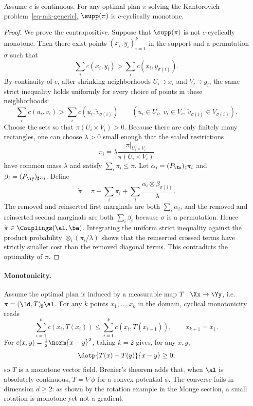 \begin{thm}\label{thm:opt_ccm}
	Assume $c$ is continuous. For any optimal plan $\pi$ solving the Kantorovich problem~\eqref{eq-mk-generic}, $\supp(\pi)$ is $c$-cyclically monotone.
\end{thm}
\begin{proof}
	We prove the contrapositive. Suppose that $\supp(\pi)$ is not $c$-cyclically monotone. Then there exist points $(x_i,y_i)_{i=1}^k$ in the support and a permutation $\sigma$ such that
	\[
		\sum_i c(x_i,y_i)>
		\sum_i c(x_i,y_{\sigma(i)}).
	\]
	By continuity of $c$, after shrinking neighborhoods $U_i\ni x_i$ and $V_i\ni y_i$, the same strict inequality holds uniformly for every choice of points in these neighborhoods:
	\[
		\sum_i c(u_i,v_i)
		>
		\sum_i c(u_i,\tilde v_{\sigma(i)})
		\qquad
		(u_i\in U_i,\ v_i\in V_i,\ \tilde v_{\sigma(i)}\in V_{\sigma(i)}).
	\]
	Choose the sets so that $\pi(U_i\times V_i)>0$. Because there are only finitely many rectangles, one can choose $\lambda>0$ small enough that the scaled restrictions
	\[
		\pi_i=\lambda\frac{\pi|_{U_i\times V_i}}{\pi(U_i\times V_i)}
	\]
	have common mass $\lambda$ and satisfy $\sum_i\pi_i\leq\pi$. Let $\alpha_i=(P_\Xx)_\sharp\pi_i$ and $\beta_i=(P_\Yy)_\sharp\pi_i$. Define
	\[
		\tilde\pi
		=
		\pi-\sum_i\pi_i
		+\sum_i \frac{\alpha_i\otimes\beta_{\sigma(i)}}{\lambda}.
	\]
	The removed and reinserted first marginals are both $\sum_i\alpha_i$, and the removed and reinserted second marginals are both $\sum_i\beta_i$ because $\sigma$ is a permutation. Hence $\tilde\pi\in\Couplings(\al,\be)$. Integrating the uniform strict inequality against the product probability $\otimes_i(\pi_i/\lambda)$ shows that the reinserted crossed terms have strictly smaller cost than the removed diagonal terms. This contradicts the optimality of $\pi$.
\end{proof}

\paragraph{Monotonicity.}

Assume the optimal plan is induced by a measurable map $T:\Xx\to\Yy$, i.e. $\pi=(\Id,T)_\sharp\al$. For any $k$ points $x_1,\ldots,x_k$ in the domain, cyclical monotonicity reads
\[
	\sum_{i=1}^k c(x_i,T(x_i))
	\leq
	\sum_{i=1}^k c(x_i,T(x_{i+1})),
	\qquad x_{k+1}=x_1.
\]
For $c(x,y)=\frac12\norm{x-y}^2$, taking $k=2$ gives, for any $x,y$,
\[
	\dotp{T(x)-T(y)}{x-y}\geq0,
\]
so $T$ is a monotone vector field. Brenier's theorem adds that, when $\al$ is absolutely continuous, $T=\nabla\phi$ for a convex potential $\phi$. The converse fails in dimension $d\geq2$: as shown by the rotation example in the Monge section, a small rotation is monotone yet not a gradient.

